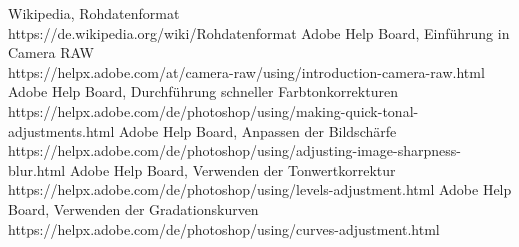 \documentclass[notoc, landscape]{school}
\begin{document}
\begin{thebibliography}{9}

 Wikipedia, Rohdatenformat \\ https://de.wikipedia.org/wiki/Rohdatenformat
 Adobe Help Board, Einführung in Camera RAW \\ https://helpx.adobe.com/at/camera-raw/using/introduction-camera-raw.html
 Adobe Help Board, Durchführung schneller Farbtonkorrekturen \\ https://helpx.adobe.com/de/photoshop/using/making-quick-tonal-adjustments.html
 Adobe Help Board, Anpassen der Bildschärfe \\ https://helpx.adobe.com/de/photoshop/using/adjusting-image-sharpness-blur.html
 Adobe Help Board, Verwenden der Tonwertkorrektur \\ https://helpx.adobe.com/de/photoshop/using/levels-adjustment.html
 Adobe Help Board, Verwenden der Gradationskurven \\ https://helpx.adobe.com/de/photoshop/using/curves-adjustment.html

\end{thebibliography}
\end{document}

